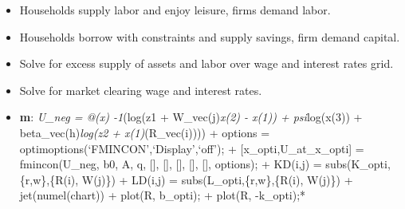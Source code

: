 \documentclass[
]{book}
\providecommand{\tightlist}{%
  \setlength{\itemsep}{0pt}\setlength{\parskip}{0pt}}
\begin{document}
\begin{enumerate}
  \begin{itemize}
  \tightlist
  \item
    Households supply labor and enjoy leisure, firms demand labor.
  \item
    Households borrow with constraints and supply savings, firm demand capital.
  \item
    Solve for excess supply of assets and labor over wage and interest rates grid.
  \item
    Solve for market clearing wage and interest rates.
  \item
    \textbf{m}: \emph{U\_neg = @(x) -1}(log(z1 + W\_vec(j)\emph{x(2) - x(1)) + psi}log(x(3)) + beta\_vec(h)\emph{log(z2 + x(1)}(R\_vec(i)))) + options = optimoptions(`FMINCON',`Display',`off'); + {[}x\_opti,U\_at\_x\_opti{]} = fmincon(U\_neg, b0, A, q, {[}{]}, {[}{]}, {[}{]}, {[}{]}, {[}{]}, options); + KD(i,j) = subs(K\_opti,\{r,w\},\{R(i), W(j)\}) + LD(i,j) = subs(L\_opti,\{r,w\},\{R(i), W(j)\}) + jet(numel(chart)) + plot(R, b\_opti); + plot(R, -k\_opti);*
  \end{itemize}
\end{enumerate}

  
\end{document}
